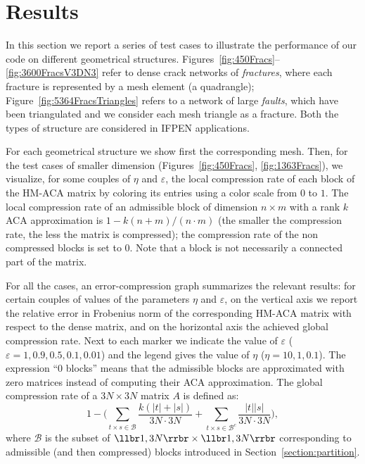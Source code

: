 


\section{Results}

In this section we report a series of test cases to illustrate the performance of our code on different geometrical structures.
Figures~\ref{fig:450Fracs}--\ref{fig:3600FracsV3DN3} refer to dense crack networks of \emph{fractures}, where each fracture is represented by a mesh element (a quadrangle);    
Figure~\ref{fig:5364FracsTriangles} refers to a network of large \emph{faults}, which have been triangulated and we consider each mesh triangle as a fracture. Both the types of structure are considered in IFPEN applications.

For each geometrical structure we show first the corresponding mesh.
Then, for the test cases of smaller dimension (Figures~\ref{fig:450Fracs}, \ref{fig:1363Fracs}), we visualize, for some couples of $\eta$ and $\varepsilon$, the local compression rate of each block of the HM-ACA matrix by coloring its entries using a color scale from $0$ to $1$. The local compression rate of an admissible block of dimension $n\times m$ with a rank $k$ ACA approximation is $1-k(n+m)/(n\cdot m)$ (the smaller the compression rate, the less the matrix is compressed); the compression rate of the non compressed blocks is set to $0$. Note that a block is not necessarily a connected part of the matrix.

For all the cases, an error-compression graph summarizes the relevant results: for certain couples of values of the parameters $\eta$ and $\varepsilon$, on the vertical axis we report the relative error in Frobenius norm of the corresponding HM-ACA matrix with respect to the dense matrix, and on the horizontal axis the achieved global compression rate. Next to each marker we indicate the value of $\varepsilon$ ($\varepsilon=1, 0.9, 0.5, 0.1, 0.01$) and the legend gives the value of $\eta$ ($\eta=10,1,0.1$). The expression ``0 blocks'' means that the admissible blocks are approximated with zero matrices instead of computing their ACA approximation.
The global compression rate of a $3N\times 3N$ matrix $A$ is defined as:
\[
1- \Biggl(\sum_{t \times s \in \mathscr{B}}{\frac{k(\lvert t \rvert + \lvert s \rvert)}{3N\cdot3N} } + 
\sum_{t \times s \in \mathscr{B}^c}{\frac{\lvert t \rvert \lvert s \rvert}{3N\cdot3N} } \Biggr),
\]
where $\mathscr{B}$ is the subset of $\llbr 1,3N\rrbr\times \llbr 1,3N\rrbr$ corresponding to admissible (and then compressed) blocks introduced in Section~\ref{section:partition}.

